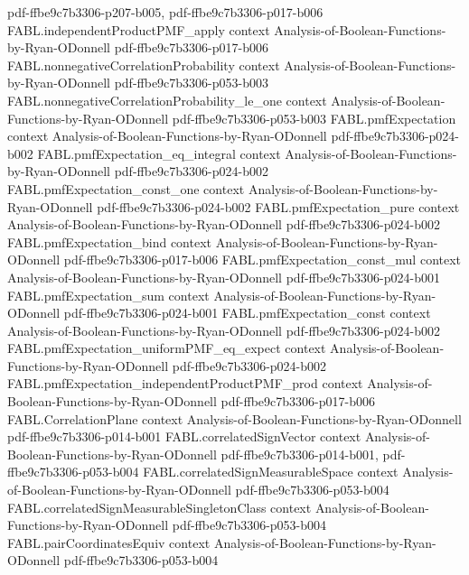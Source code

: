 \begin{theorem}
  {pdf-ffbe9c7b3306-p207-b005,
    pdf-ffbe9c7b3306-p017-b006}
\proofstep
  {FABL.independentProductPMF_apply}
  {context}
  {Analysis-of-Boolean-Functions-by-Ryan-ODonnell}
  {pdf-ffbe9c7b3306-p017-b006}
\proofstep
  {FABL.nonnegativeCorrelationProbability}
  {context}
  {Analysis-of-Boolean-Functions-by-Ryan-ODonnell}
  {pdf-ffbe9c7b3306-p053-b003}
\proofstep
  {FABL.nonnegativeCorrelationProbability_le_one}
  {context}
  {Analysis-of-Boolean-Functions-by-Ryan-ODonnell}
  {pdf-ffbe9c7b3306-p053-b003}
\proofstep
  {FABL.pmfExpectation}
  {context}
  {Analysis-of-Boolean-Functions-by-Ryan-ODonnell}
  {pdf-ffbe9c7b3306-p024-b002}
\proofstep
  {FABL.pmfExpectation_eq_integral}
  {context}
  {Analysis-of-Boolean-Functions-by-Ryan-ODonnell}
  {pdf-ffbe9c7b3306-p024-b002}
\proofstep
  {FABL.pmfExpectation_const_one}
  {context}
  {Analysis-of-Boolean-Functions-by-Ryan-ODonnell}
  {pdf-ffbe9c7b3306-p024-b002}
\proofstep
  {FABL.pmfExpectation_pure}
  {context}
  {Analysis-of-Boolean-Functions-by-Ryan-ODonnell}
  {pdf-ffbe9c7b3306-p024-b002}
\proofstep
  {FABL.pmfExpectation_bind}
  {context}
  {Analysis-of-Boolean-Functions-by-Ryan-ODonnell}
  {pdf-ffbe9c7b3306-p017-b006}
\proofstep
  {FABL.pmfExpectation_const_mul}
  {context}
  {Analysis-of-Boolean-Functions-by-Ryan-ODonnell}
  {pdf-ffbe9c7b3306-p024-b001}
\proofstep
  {FABL.pmfExpectation_sum}
  {context}
  {Analysis-of-Boolean-Functions-by-Ryan-ODonnell}
  {pdf-ffbe9c7b3306-p024-b001}
\proofstep
  {FABL.pmfExpectation_const}
  {context}
  {Analysis-of-Boolean-Functions-by-Ryan-ODonnell}
  {pdf-ffbe9c7b3306-p024-b002}
\proofstep
  {FABL.pmfExpectation_uniformPMF_eq_expect}
  {context}
  {Analysis-of-Boolean-Functions-by-Ryan-ODonnell}
  {pdf-ffbe9c7b3306-p024-b002}
\proofstep
  {FABL.pmfExpectation_independentProductPMF_prod}
  {context}
  {Analysis-of-Boolean-Functions-by-Ryan-ODonnell}
  {pdf-ffbe9c7b3306-p017-b006}
\proofstep
  {FABL.CorrelationPlane}
  {context}
  {Analysis-of-Boolean-Functions-by-Ryan-ODonnell}
  {pdf-ffbe9c7b3306-p014-b001}
\proofstep
  {FABL.correlatedSignVector}
  {context}
  {Analysis-of-Boolean-Functions-by-Ryan-ODonnell}
  {pdf-ffbe9c7b3306-p014-b001,
    pdf-ffbe9c7b3306-p053-b004}
\proofstep
  {FABL.correlatedSignMeasurableSpace}
  {context}
  {Analysis-of-Boolean-Functions-by-Ryan-ODonnell}
  {pdf-ffbe9c7b3306-p053-b004}
\proofstep
  {FABL.correlatedSignMeasurableSingletonClass}
  {context}
  {Analysis-of-Boolean-Functions-by-Ryan-ODonnell}
  {pdf-ffbe9c7b3306-p053-b004}
\proofstep
  {FABL.pairCoordinatesEquiv}
  {context}
  {Analysis-of-Boolean-Functions-by-Ryan-ODonnell}
  {pdf-ffbe9c7b3306-p053-b004}

\end{theorem}
